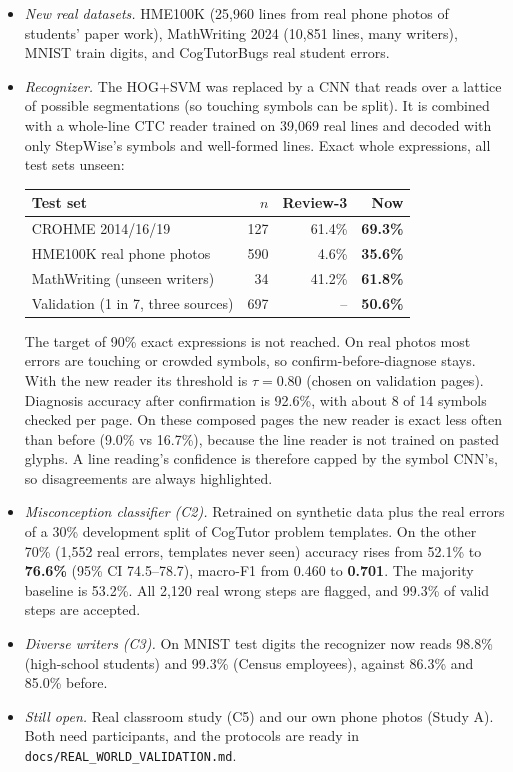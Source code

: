 \documentclass[10pt]{article}
\begin{document}
\begin{itemize}
\item \textit{New real datasets.} HME100K (25,960 lines from real phone photos of students' paper
work), MathWriting 2024 (10,851 lines, many writers), MNIST train digits, and CogTutorBugs real
student errors.
\item \textit{Recognizer.} The HOG+SVM was replaced by a CNN that reads over a lattice of possible
segmentations (so touching symbols can be split). It is combined with a whole-line CTC reader
trained on 39,069 real lines and decoded with only StepWise's symbols and well-formed lines. Exact whole expressions, all test sets unseen:
\begin{center}\begin{tabular}{lrrr}\toprule
Test set & $n$ & Review-3 & Now\\\midrule
CROHME 2014/16/19 & 127 & 61.4\% & \textbf{69.3\%}\\
HME100K real phone photos & 590 & 4.6\% & \textbf{35.6\%}\\
MathWriting (unseen writers) & 34 & 41.2\% & \textbf{61.8\%}\\
Validation (1 in 7, three sources) & 697 & -- & \textbf{50.6\%}\\\bottomrule
\end{tabular}\end{center}
The target of 90\% exact expressions is not reached. On real photos most errors are touching or
crowded symbols, so confirm-before-diagnose stays. With the new reader its threshold is
$\tau=0.80$ (chosen on validation pages). Diagnosis accuracy after confirmation is 92.6\%, with
about 8 of 14 symbols checked per page. On these composed pages the new reader is exact less often
than before (9.0\% vs 16.7\%), because the line reader is not trained on pasted glyphs. A line
reading's confidence is therefore capped by the symbol CNN's, so disagreements are always
highlighted.
\item \textit{Misconception classifier (C2).} Retrained on synthetic data plus the real errors of a
30\% development split of CogTutor problem templates. On the other 70\% (1,552 real errors,
templates never seen) accuracy rises from 52.1\% to \textbf{76.6\%} (95\% CI 74.5--78.7), macro-F1
from 0.460 to \textbf{0.701}. The majority baseline is 53.2\%. All 2,120 real wrong steps are
flagged, and 99.3\% of valid steps are accepted.
\item \textit{Diverse writers (C3).} On MNIST test digits the recognizer now reads 98.8\% (high-school
students) and 99.3\% (Census employees), against 86.3\% and 85.0\% before.
\item \textit{Still open.} Real classroom study (C5) and our own phone photos (Study A). Both need
participants, and the protocols are ready in \texttt{docs/REAL\_WORLD\_VALIDATION.md}.
\end{itemize}
\end{document}
